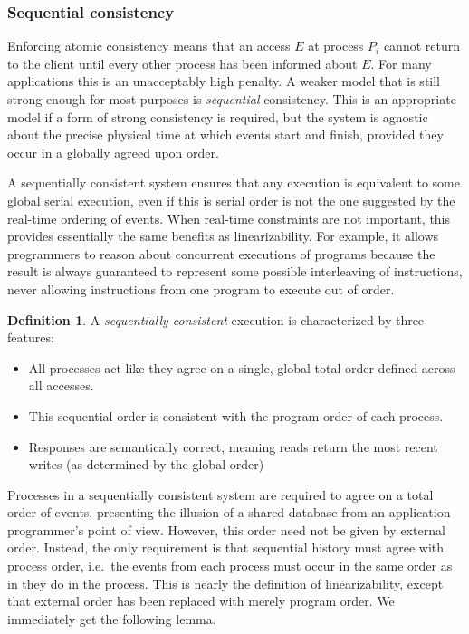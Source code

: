 \documentclass[]             %
{NASA}                       %
\theoremstyle{definition}
\newtheorem{definition}{Definition}[section]
\begin{document}
\subsubsection{Sequential consistency}
\label{sequential-consistency}

Enforcing atomic consistency means that an access \(E\) at process
\(P_i\) cannot return to the client until every other process has been
informed about \(E\). For many applications this is an unacceptably high
penalty. A weaker model that is still strong enough for most purposes is
\emph{sequential} consistency. This is an appropriate model if a form of
strong consistency is required, but the system is agnostic about the
precise physical time at which events start and finish, provided they
occur in a globally agreed upon order.

A sequentially consistent system ensures that any execution is
equivalent to some global serial execution, even if this is serial order
is not the one suggested by the real-time ordering of events. When
real-time constraints are not important, this provides essentially the
same benefits as linearizability. For example, it allows programmers to
reason about concurrent executions of programs because the result is
always guaranteed to represent some possible interleaving of
instructions, never allowing instructions from one program to execute
out of order.

\begin{definition}
  \label{def:sequentiallyconsistent}
  A \emph{sequentially consistent} execution is
  characterized by three features:
  \begin{itemize}
  \item All processes act like they agree on a single, global total order
    defined across all accesses.
  \item This sequential order is consistent with the program order of each process.
  \item Responses are semantically correct, meaning reads return the most recent writes (as determined by the global order)
  \end{itemize}
\end{definition}

Processes in a sequentially consistent system are required to agree on a
total order of events, presenting the illusion of a shared database from
an application programmer's point of view. However, this order need not
be given by external order. Instead, the only requirement is that
sequential history must agree with process order, i.e.~the events from
each process must occur in the same order as in they do in the process.
This is nearly the definition of linearizability, except that external
order has been replaced with merely program order. We immediately get
the following lemma.
\end{document}
